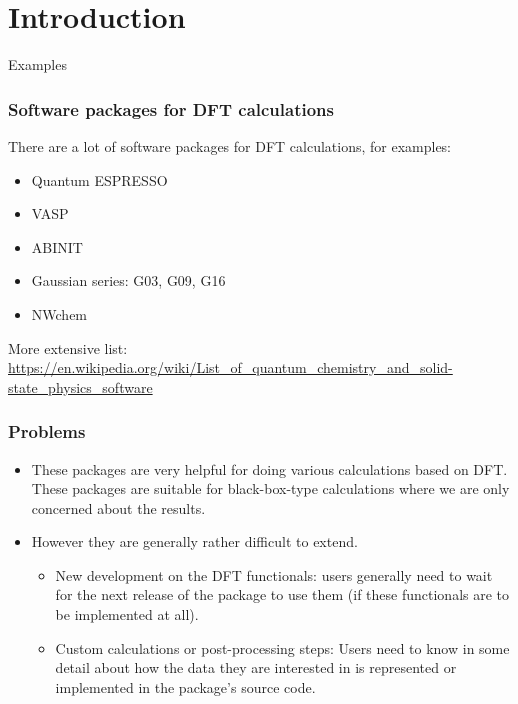 \section{Introduction}

\begin{frame}[plain]
\begin{center}
\Huge{Examples}
\end{center}
\end{frame}


\begin{frame}
\frametitle{Software packages for DFT calculations}

There are a lot of software packages for DFT calculations, for examples:
\begin{itemize}
\item Quantum ESPRESSO
\item VASP
\item ABINIT
\item Gaussian series: G03, G09, G16
\item NWchem
\end{itemize}

More extensive list:
{\scriptsize
\url{https://en.wikipedia.org/wiki/List_of_quantum_chemistry_and_solid-state_physics_software}
}

\end{frame}


\begin{frame}
\frametitle{Problems}

\begin{itemize}
\item These packages are very helpful for doing various calculations based on DFT.
%
These packages are suitable for black-box-type calculations where we are only concerned about the results.
%
\item However they are generally rather difficult to extend.
  \begin{itemize}
  \item New development on the DFT functionals:
  users generally need to wait for the next release of the package to use them
  (if these functionals are to be implemented at all).
  \item Custom calculations or post-processing steps:
  Users need to know in some detail
  about how the data they are interested in is represented or implemented in the package's source code.
  \end{itemize}
\end{itemize}

\end{frame}

